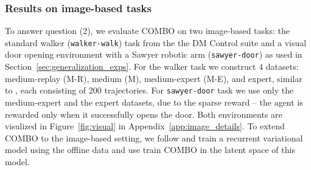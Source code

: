 

\subsubsection{Results on image-based tasks}

To answer question (2), we evaluate COMBO on two image-based tasks: the standard walker (\texttt{walker-walk}) task from the the DM Control suite \cite{tassa2018deepmind} and a visual door opening environment with a Sawyer robotic arm (\texttt{sawyer-door}) as used in Section~\ref{sec:generalization_exps}. For the walker task we construct 4 datasets: medium-replay (M-R), medium (M), medium-expert (M-E), and expert, similar to \citet{fu2020d4rl}, each consisting of 200 trajectories. For \texttt{sawyer-door} task we use only the medium-expert and the expert datasets, due to the sparse reward -- the agent is rewarded only when it successfully opens the door. Both environments are visulized in Figure~\ref{fig:visual} in Appendix~\ref{app:image_details}. To extend COMBO to the image-based setting, we follow \citet{Rafailov2020LOMPO} and train a recurrent variational model using the offline data and use train COMBO in the latent space of this model.


